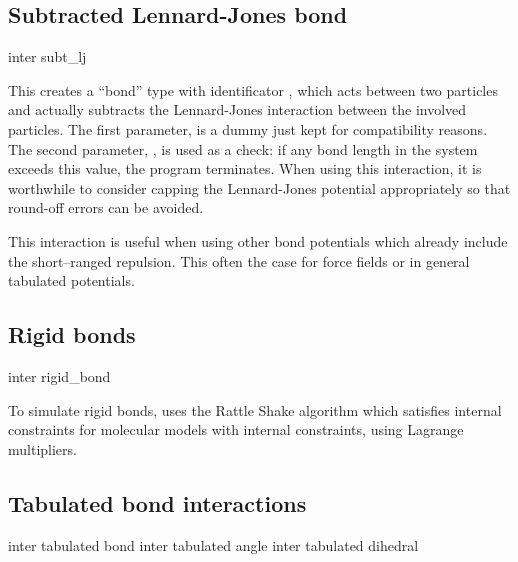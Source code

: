 \subsection{Subtracted Lennard-Jones bond}

\begin{essyntax}
  inter 
  subt_lj
   
\end{essyntax}
This creates a ``bond'' type with identificator , which
acts between two particles and actually subtracts the Lennard-Jones interaction
between the involved particles.  The first parameter,  is a dummy
just kept for compatibility reasons. The second parameter, , is used as a
check: if any bond length in the system exceeds this value, the program
terminates. When using this interaction, it is worthwhile to consider
capping the Lennard-Jones potential appropriately so that round-off errors can
be avoided.

This interaction is useful when using other bond potentials which already
include the short--ranged repulsion. This often the case for force fields or in
general tabulated potentials.

\subsection{Rigid bonds}
\label{sec:rattle}

\begin{essyntax}
  inter 
  rigid_bond
    
\end{essyntax}

To simulate rigid bonds, \es uses the Rattle Shake algorithm which
satisfies internal constraints for molecular models with internal
constraints, using Lagrange multipliers.\cite{andersen83a}

\subsection{Tabulated bond interactions}

\begin{essyntax}
     inter 
    tabulated bond 
     inter 
    tabulated angle 
     inter 
    tabulated dihedral 
\end{essyntax}

